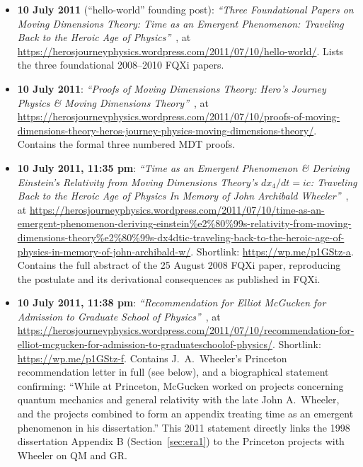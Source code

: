 \documentclass[11pt,a4paper]{article}
\begin{document}
\begin{itemize}
\item \textbf{10 July 2011} (``hello-world'' founding post): \emph{``Three Foundational Papers on Moving Dimensions Theory: Time as an Emergent Phenomenon: Traveling Back to the Heroic Age of Physics''}~\cite{mcguckenherosjourney2011c}, at \url{https://herosjourneyphysics.wordpress.com/2011/07/10/hello-world/}. Lists the three foundational 2008--2010 FQXi papers.

\item \textbf{10 July 2011}: \emph{``Proofs of Moving Dimensions Theory: Hero's Journey Physics \& Moving Dimensions Theory''}~\cite{mcguckenherosjourney2011d}, at \url{https://herosjourneyphysics.wordpress.com/2011/07/10/proofs-of-moving-dimensions-theory-heros-journey-physics-moving-dimensions-theory/}. Contains the formal three numbered MDT proofs.

\item \textbf{10 July 2011, 11:35 pm}: \emph{``Time as an Emergent Phenomenon \& Deriving Einstein's Relativity from Moving Dimensions Theory's $dx_4/dt=ic$: Traveling Back to the Heroic Age of Physics In Memory of John Archibald Wheeler''}~\cite{mcguckenherosjourney2011e}, at \url{https://herosjourneyphysics.wordpress.com/2011/07/10/time-as-an-emergent-phenomenon-deriving-einstein\%e2\%80\%99s-relativity-from-moving-dimensions-theory\%e2\%80\%99s-dx4dtic-traveling-back-to-the-heroic-age-of-physics-in-memory-of-john-archibald-w/}. Shortlink: \url{https://wp.me/p1GStz-a}. Contains the full abstract of the 25 August 2008 FQXi paper, reproducing the postulate and its derivational consequences as published in FQXi.

\item \textbf{10 July 2011, 11:38 pm}: \emph{``Recommendation for Elliot McGucken for Admission to Graduate School of Physics''}~\cite{mcguckenherosjourney2011f}, at \url{https://herosjourneyphysics.wordpress.com/2011/07/10/recommendation-for-elliot-mcgucken-for-admission-to-graduateschoolof-physics/}. Shortlink: \url{https://wp.me/p1GStz-f}. Contains J.\ A.\ Wheeler's Princeton recommendation letter in full (see below), and a biographical statement confirming: ``While at Princeton, McGucken worked on projects concerning quantum mechanics and general relativity with the late John A.\ Wheeler, and the projects combined to form an appendix treating time as an emergent phenomenon in his dissertation.'' This 2011 statement directly links the 1998 dissertation Appendix B (Section~\ref{sec:era1}) to the Princeton projects with Wheeler on QM and GR.


\end{itemize}
\end{document}

